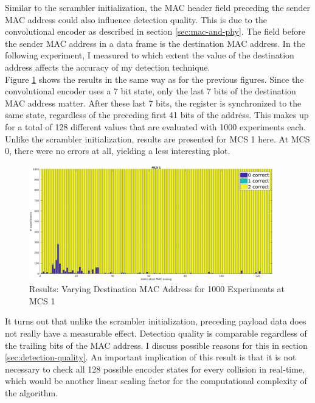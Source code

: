 Similar to the scrambler initialization, the \gls{MAC} header field preceding the sender \gls{MAC} address could also influence detection quality. This is due to the convolutional encoder as described in section \ref{sec:mac-and-phy}. The field before the sender \gls{MAC} address in a data frame is the destination \gls{MAC} address. In the following experiment, I measured to which extent the value of the destination address affects the accuracy of my detection technique.\\

Figure \ref{fig:vary_dest} shows the results in the same way as for the previous figures. Since the convolutional encoder uses a 7 bit state, only the last 7 bits of the destination \gls{MAC} address matter. After these last 7 bits, the register is synchronized to the same state, regardless of the preceding first 41 bits of the address. This makes up for a total of 128 different values that are evaluated with 1000 experiments each. Unlike the scrambler initialization, results are presented for \gls{MCS} 1 here. At \gls{MCS} 0, there were no errors at all, yielding a less interesting plot.

\begin{figure}[H]
	\centering
	\includegraphics[height=5cm]{gfx/plots/destination}
	\caption[Results: Varying Destination \gls{MAC} Address for 1000 Experiments]{Results: Varying Destination \gls{MAC} Address for 1000 Experiments at MCS 1}
	\label{fig:vary_dest}
\end{figure}

It turns out that unlike the scrambler initialization, preceding payload data does not really have a measurable effect. Detection quality is comparable regardless of the trailing bits of the \gls{MAC} address. I discuss possible reasons for this in section \ref{sec:detection-quality}. An important implication of this result is that it is not necessary to check all 128 possible encoder states for every collision in real-time, which would be another linear scaling factor for the computational complexity of the algorithm.


